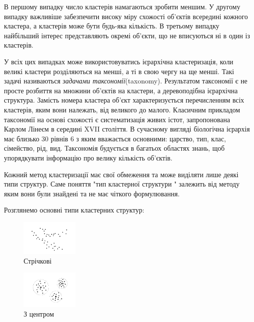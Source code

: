 \documentclass[a4paper,14pt,russian]{extreport}
\begin{document}
	\par В першому випадку число кластерів намагаються зробити меншим. У другому випадку важливіше забезпечити високу міру схожості об'єктів всередині кожного кластера, а кластерів може бути будь-яка кількість. В третьому випадку найбільший інтерес представляють окремі об'єкти, що не вписуються ні в один із кластерів.  \par 
	У всіх цих випадках може використовуватись ієрархічна кластеризація, коли великі кластери розділяються на менші, а ті в свою чергу на ще менші. Такі задачі називаються \textit{задачами таксономії}(taxonomy). Результатом таксономії є не просте розбиття на множини об'єктів на кластери, а деревоподібна ієрархічна структура. Замість номера кластера об'єкт характеризується перечисленням всіх кластерів, яким вони належать, від великого до малого. Класичним прикладом таксономії на основі схожості є систематизація живих істот, запропонована Карлом Лінеєм в середині XVII століття. В сучасному вигляді біологічна ієрархія має близько 30 рівнів 6 з яким вважається основними: царство, тип, клас, сімейство, рід, вид. Таксономія будується в багатьох областях знань, щоб упорядкувати інформацію про велику кількість об'єктів. 
	\par
	Кожний метод кластеризації має свої обмеження та може виділяти лише деякі типи структур. Саме поняття "тип кластерної структури " залежить від методу яким вони були знайдені та не має чіткого формулювання.
	\par Розглянемо основні типи кластерних структур:
	
\begin{figure}[h]
    \centering
    \includegraphics[width=0.25\textwidth]{2}
    \caption{Стрічкові}
\end{figure}
	
	\begin{figure}[h]
    \centering
    \includegraphics[width=0.25\textwidth]{3}
    \caption{З центром}
\end{figure}
\end{document}

